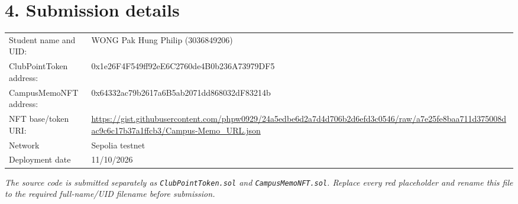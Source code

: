 \documentclass[9pt,a4paper]{article}
\newcommand{\code}[1]{\texttt{\small #1}}
\begin{document}
\section*{4. Submission details}
\begin{tabular}{@{}ll}
Student name and UID: & WONG Pak Hung Philip (3036849206)\\
ClubPointToken address: & 0x1e26F4F549ff92eE6C2760de4B0b236A73979DF5\\
CampusMemoNFT address: & 0x64332ac79b2617a6B5ab2071dd868032dF83214b\\
NFT base/token URI: & \url{https://gist.githubusercontent.com/phpw0929/24a5edbe6d2a7d4d706b2d6efd3c0546/raw/a7e25fe8baa711d375008dac9c6c17b37a1ffcb3/Campus-Memo_URL.json}\\
Network & Sepolia testnet\\
Deployment date & 11/10/2026\\
\end{tabular}

\vfill
\footnotesize\textit{The source code is submitted separately as \code{ClubPointToken.sol} and \code{CampusMemoNFT.sol}. Replace every red placeholder and rename this file to the required full-name/UID filename before submission.}
\end{document}
